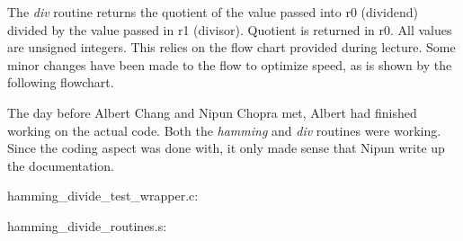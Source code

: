 \documentclass[letterpaper,10pt]{article}
\begin{document}
    

    

    The \textit{div} routine returns the quotient of the value passed into
    r0 (dividend) divided by the value passed in r1 (divisor). Quotient is
    returned in r0. All values are unsigned integers. This relies on the flow
    chart provided during lecture. Some minor changes have been made to the
    flow to optimize speed, as is shown by the following flowchart.

    

    The day before Albert Chang and Nipun Chopra met, Albert had finished
    working on the actual code. Both the \textit{hamming} and \textit{div}
    routines were working. Since the coding aspect was done with, it only made
    sense that Nipun write up the documentation.

    hamming\_divide\_test\_wrapper.c:
    

    hamming\_divide\_routines.s:
    
\end{document}
